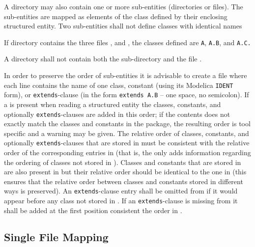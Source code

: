 A directory may also contain one or more sub-entities (directories or files).
The sub-entities are mapped as elements of the class defined by their enclosing structured entity.
Two sub-entities shall not define classes with identical names

\begin{example}
If directory  contains the three files ,  and , the classes defined are \lstinline!A!,
\lstinline!A.B!, and \lstinline!A.C.!
\end{example}

\begin{example}
A directory shall not contain both the sub-directory  and the file .
\end{example}

In order to preserve the order of sub-entities it is advisable to create a file  where each line contains the name of one class, constant (using its Modelica \lstinline!IDENT! form), or \lstinline!extends!-clause (in the form \lstinline!extends A.B! -- one space, no semicolon).
If a  is present when reading a structured entity the classes, constants, and optionally \lstinline!extends!-clauses are added in this order; if the contents does not exactly match the classes and constants in the package, the resulting order is tool specific and a warning may be given.
The relative order of classes, constants, and optionally \lstinline!extends!-clauses that are stored in  must be consistent with the relative order of the corresponding entries in  (that is, the  only adds information regarding the ordering of classes not stored in ).
Classes and constants that are stored in  are also present in  but their relative order should be identical to the one in  (this ensures that the relative order between classes and constants stored in different ways is preserved).
An \lstinline!extends!-clause entry shall be omitted from  if it would appear before any class not stored in .
If an \lstinline!extends!-clause is missing from  it shall be added at the first position consistent the order in .


\subsection{Single File Mapping}\label{mapping-a-package-class-hierarchy-into-a-single-file-nonstructured-entity}\label{single-file-mapping}

